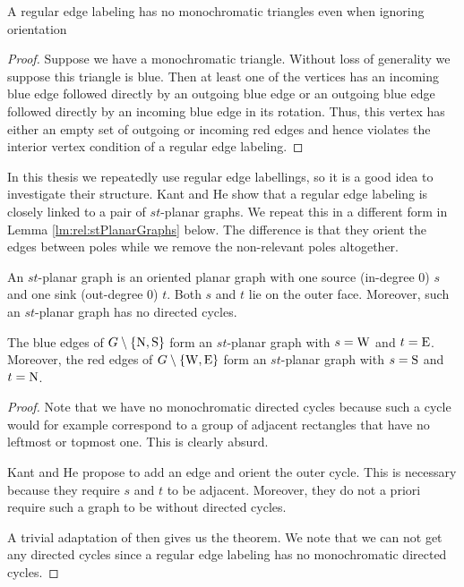   \begin{lemma}
    \label{lm:rel:noMonoColoredTriangles}
    A regular edge labeling has no monochromatic triangles even when ignoring orientation
  \end{lemma}

  \begin{proof}
    Suppose we have a monochromatic triangle. Without loss of generality we suppose this triangle is blue. Then at least one of the vertices has an incoming blue edge followed directly by an outgoing blue edge or an outgoing blue edge followed directly by an incoming blue edge in its rotation. Thus, this vertex has either an empty set of outgoing or incoming red edges and hence violates the interior vertex condition of a regular edge labeling.
  \end{proof}

    In this thesis we repeatedly use regular edge labellings, so it is a good idea to investigate their structure.
    Kant and He \cite{Kant1997} show that a regular edge labeling is closely linked to a pair of $st$-planar graphs. We repeat this in a different form in Lemma \ref{lm:rel:stPlanarGraphs} below. The difference is that they orient the edges between poles while we remove the non-relevant poles altogether.

    An $st$-planar graph is an oriented planar graph with one source (in-degree 0) $s$ and one sink (out-degree 0) $t$. Both $s$ and $t$ lie on the outer face. Moreover, such an $st$-planar graph has no directed cycles.

    \begin{lemma}
      \label{lm:rel:stPlanarGraphs}
      The blue edges of $G\setminus \left\lbrace {\mathrm{N},\mathrm{S}} \right\rbrace$ form an $st$-planar graph with $s= \mathrm{W}$ and $t=\mathrm{E}$. Moreover, the red edges of $G\setminus \left\lbrace {\mathrm{W},\mathrm{E}} \right\rbrace$ form an $st$-planar graph with $s= \mathrm{S}$ and $t= \mathrm{N}$.
    \end{lemma}
    \begin{proof}
      Note that we have no monochromatic directed cycles because such a cycle would for example correspond to a  group of adjacent rectangles that have  no leftmost or topmost one. This is clearly absurd.

      Kant and He propose to add an edge and orient the outer cycle. This is necessary because they require $s$ and $t$ to be adjacent. Moreover, they do not a priori require such a graph to be without directed cycles.

      A trivial adaptation of \cite[pp.179]{Kant1997} then gives us the theorem. We note that we can not get any directed cycles since a regular edge labeling has no monochromatic directed cycles.
    \end{proof}


